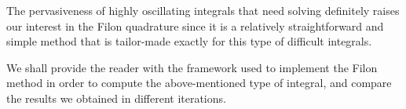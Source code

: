 \vspace{0.25in}

The pervasiveness of highly oscillating integrals that need solving definitely raises our interest in the Filon quadrature since it is a relatively straightforward and simple method that is tailor-made exactly for this type of difficult integrals.

\vspace{0.25in}

We shall provide the reader with the framework used to implement the Filon method in order to compute the above-mentioned type of integral, and compare the results we obtained in different iterations.


